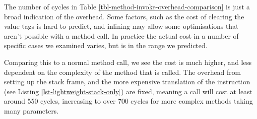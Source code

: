 The number of cycles in Table \ref{tbl-method-invoke-overhead-comparison} is just a broad indication of the overhead. Some factors, such as the cost of clearing the value tags is hard to predict, and inlining may allow some optimisations that aren't possible with a method call. In practice the actual cost in a number of specific cases we examined varies, but is in the range we predicted.

Comparing this to a normal method call, we see the cost is much higher, and less dependent on the complexity of the method that is called. The overhead from setting up the stack frame, and the more expensive translation of the  instruction (see Listing \ref{lst-lightweight-stack-only}) are fixed, meaning a call will cost at least around 550 cycles, increasing to over 700 cycles for more complex methods taking many parameters.

